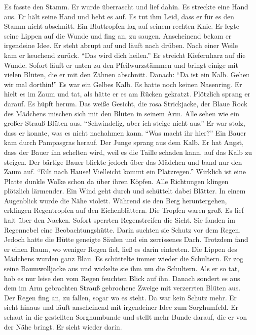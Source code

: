 \documentclass[prd,12pt,tightenlines,notitlepage,nofootinbib]{revtex4-1}
\begin{document}
Es fasste den Stamm.  Er wurde überrascht und lief dahin.  Es streckte
eine Hand aus.  Er hält seine Hand und hebt es auf.  Es tut ihm Leid,
dass er für es den Stamm nicht abschnitt.  Ein Bluttropfen lag auf
seinem rechten Knie.  Er legte seine Lippen auf die Wunde und fing an,
zu saugen.  Anscheinend bekam er irgendeine Idee.  Er steht abrupt auf
und läuft nach drüben.  Nach einer Weile kam er keuchend zurück.  "`Das
wird dich heilen."'  Er streicht Kiefernharz auf die Wunde.  Sofort
läuft er unten zu den Pfeilwurzstämmen und bringt einige mit vielen
Blüten, die er mit den Zähnen abschnitt.  Danach: "`Da ist ein Kalb.
Gehen wir mal dorthin!"'  Es war ein Gelbes Kalb.  Es hatte noch keinen
Nasenring.  Er hielt es im Zaum und tat, als hätte er es am Rücken
gekratzt.  Plötzlich sprang er darauf.  Es hüpft herum.
Das weiße Gesicht, die rosa Strickjacke, der Blaue Rock des
Mädchens mischen sich mit den Blüten in seinem Arm.  Alle sehen wie
ein großer Strauß Blüten aus.  "`Schwindelig, aber ich steige nicht
aus."'  Er war stolz, dass er konnte, was es nicht nachahmen kann.
"`Was macht ihr hier?"'  Ein Bauer kam durch Pampasgras herauf.  Der
Junge sprang aus dem Kalb.  Er hat Angst, dass der Bauer ihn schelten
wird, weil es die Taille schaden kann, auf das Kalb zu steigen.  Der
bärtige Bauer blickte jedoch über das Mädchen und band nur den Zaum
auf.  "`Eilt nach Hause!  Vielleicht kommt ein Platzregen."'  Wirklich
ist eine Platte dunkle Wolke schon da über ihren Köpfen.  Alle
Richtungen klingen plötzlich lärmender.  Ein Wind geht durch und
schüttelt dabei Blätter.  In einem Augenblick wurde die Nähe violett.
Während sie den Berg heruntergehen, erklingen Regentropfen
auf den Eichenblättern.
Die Tropfen waren groß.  Es lief kalt über den Nacken. %
Sofort sperrten Regenstreifen die Sicht.  Sie fanden im
Regennebel eine Beobachtungshütte.  Darin suchten sie Schutz vor dem Regen.
Jedoch hatte die Hütte geneigte Säulen und ein zerrissenes
Dach.  Trotzdem fand er einen Raum, wo weniger Regen fiel, ließ es
darin eintreten.  Die Lippen des Mädchens wurden ganz Blau.
Es schüttelte immer wieder die Schultern.  Er zog seine Baumwolljacke
aus und wickelte sie ihm um die Schultern.  Als er so tat, hob es nur
leise den vom Regen feuchten Blick auf ihn.  Danach sondert es aus dem
im Arm gebrachten Strauß gebrochene Zweige mit verzerrten Blüten aus.
Der Regen fing an, zu fallen, sogar wo es steht.  Da war kein Schutz
mehr.  Er sieht hinaus und läuft anscheinend mit irgendeiner Idee zum
Sorghumfeld.  Er schaut in die gestellten Sorghumbunde und stellt mehr
Bunde darauf, die er von der Nähe bringt.  Er sieht wieder darin.
\end{document}
